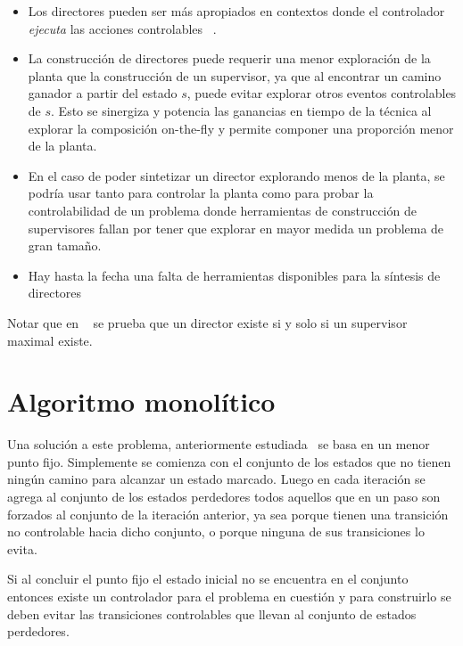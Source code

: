 \begin{itemize}
	\item Los directores pueden ser más apropiados en contextos donde el controlador \textit{ejecuta} las acciones controlables ~\cite{Huang:2008:DCD}.
	
	\item La construcción de directores puede requerir una menor exploración de la planta que la construcción de un supervisor, ya que al encontrar un camino ganador a partir del estado $s$, puede evitar explorar otros eventos controlables de $s$. Esto se sinergiza y potencia las ganancias en tiempo de la técnica al explorar la composición on-the-fly y permite componer una proporción menor de la planta.
	
	\item En el caso de poder sintetizar un director explorando menos de la planta, se podría usar tanto para controlar la planta como para probar la controlabilidad de un problema donde herramientas de construcción de supervisores fallan por tener que explorar en mayor medida un problema de gran tamaño.
	
	\item Hay hasta la fecha una falta de herramientas disponibles para la síntesis de directores
\end{itemize}

Notar que en ~\cite{Huang:2008:DCD} se prueba que un director existe si y solo si un supervisor maximal existe.

\section{Algoritmo monolítico} \label{chpt:algoMono}

Una solución a este problema, anteriormente estudiada~\cite{Ehlers:EECS-2013-162} se basa en un menor punto fijo. Simplemente se comienza con el conjunto de los estados que no tienen ningún camino para alcanzar un estado marcado. Luego en cada iteración se agrega al conjunto de los estados perdedores todos aquellos que en un paso son forzados al conjunto de la iteración anterior, ya sea porque tienen una transición no controlable hacia dicho conjunto, o porque ninguna de sus transiciones lo evita. 

Si al concluir el punto fijo el estado inicial no se encuentra en el conjunto entonces existe un controlador para el problema en cuestión y para construirlo se deben evitar las transiciones controlables que llevan al conjunto de estados perdedores.

